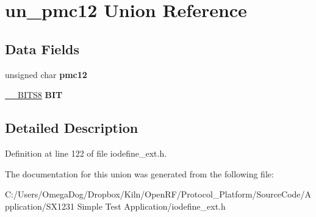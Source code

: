 \hypertarget{unionun__pmc12}{\section{un\-\_\-pmc12 Union Reference}
\label{unionun__pmc12}
}
\subsection*{Data Fields}
\begin{DoxyCompactItemize}
\item 
\hypertarget{unionun__pmc12_a6c9000c2ca387438f146f19cf190d64e}{unsigned char {\bfseries pmc12}}\label{unionun__pmc12_a6c9000c2ca387438f146f19cf190d64e}

\item 
\hypertarget{unionun__pmc12_aa3dd49e189b2da88cd733fa3af805919}{\hyperlink{struct_____b_i_t_s8}{\-\_\-\-\_\-\-B\-I\-T\-S8} {\bfseries B\-I\-T}}\label{unionun__pmc12_aa3dd49e189b2da88cd733fa3af805919}

\end{DoxyCompactItemize}


\subsection{Detailed Description}


Definition at line 122 of file iodefine\-\_\-ext.\-h.



The documentation for this union was generated from the following file\-:\begin{DoxyCompactItemize}
\item 
C\-:/\-Users/\-Omega\-Dog/\-Dropbox/\-Kiln/\-Open\-R\-F/\-Protocol\-\_\-\-Platform/\-Source\-Code/\-Application/\-S\-X1231 Simple Test Application/iodefine\-\_\-ext.\-h\end{DoxyCompactItemize}

